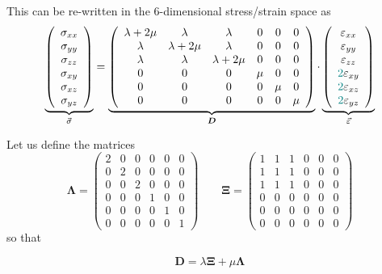 
This can be re-written in the 6-dimensional stress/strain space as
\begin{equation}
\underbrace{
\left(
\begin{array}{c}
\sigma_{xx} \\
\sigma_{yy} \\
\sigma_{zz} \\
\sigma_{xy} \\
\sigma_{xz} \\
\sigma_{yz} 
\end{array}
\right)}
_{\vec{\sigma}}
=
\underbrace{
\left(
\begin{array}{cccccc}
\lambda+2\mu & \lambda & \lambda & 0 & 0 & 0 \\ 
\lambda & \lambda+2\mu & \lambda & 0 & 0 & 0 \\ 
\lambda & \lambda & \lambda+2\mu & 0 & 0 & 0 \\
0 & 0 & 0 & \mu & 0 & 0 \\ 
0 & 0 & 0 & 0 & \mu & 0 \\ 
0 & 0 & 0 & 0 & 0 & \mu  
\end{array}
\right)}
_{{\bm D}}
\cdot
\underbrace{
\left(
\begin{array}{c}
\varepsilon_{xx} \\
\varepsilon_{yy} \\
\varepsilon_{zz} \\
{\color{teal}2}\varepsilon_{xy} \\
{\color{teal}2}\varepsilon_{xz} \\
{\color{teal}2}\varepsilon_{yz} 
\end{array}
\right)}
_{\vec{\varepsilon}}
\label{eq:el:vectors}
\end{equation}

Let us define the matrices
\[
{\bm \Lambda}=
\left(
\begin{array}{cccccc}
2 & 0 & 0 & 0 & 0 & 0 \\
0 & 2 & 0 & 0 & 0 & 0 \\
0 & 0 & 2 & 0 & 0 & 0 \\
0 & 0 & 0 & 1 & 0 & 0 \\
0 & 0 & 0 & 0 & 1 & 0 \\
0 & 0 & 0 & 0 & 0 & 1 
\end{array}
\right)
\qquad
{\bm \Xi}=
\left(
\begin{array}{cccccc}
1 & 1 & 1 & 0 & 0 & 0\\ 
1 & 1 & 1 & 0 & 0 & 0\\ 
1 & 1 & 1 & 0 & 0 & 0\\ 
0 & 0 & 0 & 0 & 0 & 0 \\
0 & 0 & 0 & 0 & 0 & 0 \\
0 & 0 & 0 & 0 & 0 & 0 
\end{array}
\right)
\]
so that 
\begin{mdframed}[backgroundcolor=blue!5]
\[
{\bm D} = \lambda {\bm \Xi} + \mu {\bm \Lambda} 
\]
\end{mdframed}

